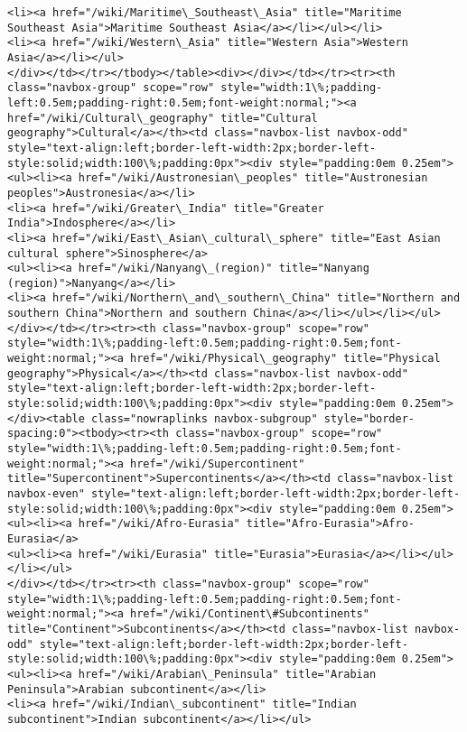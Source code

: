 \documentclass[11pt]{article}
\begin{document}
\begin{Verbatim}[commandchars=\\\{\}]
<li><a href="/wiki/Maritime\_Southeast\_Asia" title="Maritime Southeast Asia">Maritime Southeast Asia</a></li></ul></li>
<li><a href="/wiki/Western\_Asia" title="Western Asia">Western Asia</a></li></ul>
</div></td></tr></tbody></table><div></div></td></tr><tr><th class="navbox-group" scope="row" style="width:1\%;padding-left:0.5em;padding-right:0.5em;font-weight:normal;"><a href="/wiki/Cultural\_geography" title="Cultural geography">Cultural</a></th><td class="navbox-list navbox-odd" style="text-align:left;border-left-width:2px;border-left-style:solid;width:100\%;padding:0px"><div style="padding:0em 0.25em">
<ul><li><a href="/wiki/Austronesian\_peoples" title="Austronesian peoples">Austronesia</a></li>
<li><a href="/wiki/Greater\_India" title="Greater India">Indosphere</a></li>
<li><a href="/wiki/East\_Asian\_cultural\_sphere" title="East Asian cultural sphere">Sinosphere</a>
<ul><li><a href="/wiki/Nanyang\_(region)" title="Nanyang (region)">Nanyang</a></li>
<li><a href="/wiki/Northern\_and\_southern\_China" title="Northern and southern China">Northern and southern China</a></li></ul></li></ul>
</div></td></tr><tr><th class="navbox-group" scope="row" style="width:1\%;padding-left:0.5em;padding-right:0.5em;font-weight:normal;"><a href="/wiki/Physical\_geography" title="Physical geography">Physical</a></th><td class="navbox-list navbox-odd" style="text-align:left;border-left-width:2px;border-left-style:solid;width:100\%;padding:0px"><div style="padding:0em 0.25em"></div><table class="nowraplinks navbox-subgroup" style="border-spacing:0"><tbody><tr><th class="navbox-group" scope="row" style="width:1\%;padding-left:0.5em;padding-right:0.5em;font-weight:normal;"><a href="/wiki/Supercontinent" title="Supercontinent">Supercontinents</a></th><td class="navbox-list navbox-even" style="text-align:left;border-left-width:2px;border-left-style:solid;width:100\%;padding:0px"><div style="padding:0em 0.25em">
<ul><li><a href="/wiki/Afro-Eurasia" title="Afro-Eurasia">Afro-Eurasia</a>
<ul><li><a href="/wiki/Eurasia" title="Eurasia">Eurasia</a></li></ul></li></ul>
</div></td></tr><tr><th class="navbox-group" scope="row" style="width:1\%;padding-left:0.5em;padding-right:0.5em;font-weight:normal;"><a href="/wiki/Continent\#Subcontinents" title="Continent">Subcontinents</a></th><td class="navbox-list navbox-odd" style="text-align:left;border-left-width:2px;border-left-style:solid;width:100\%;padding:0px"><div style="padding:0em 0.25em">
<ul><li><a href="/wiki/Arabian\_Peninsula" title="Arabian Peninsula">Arabian subcontinent</a></li>
<li><a href="/wiki/Indian\_subcontinent" title="Indian subcontinent">Indian subcontinent</a></li></ul>

\end{Verbatim}
\end{document}
